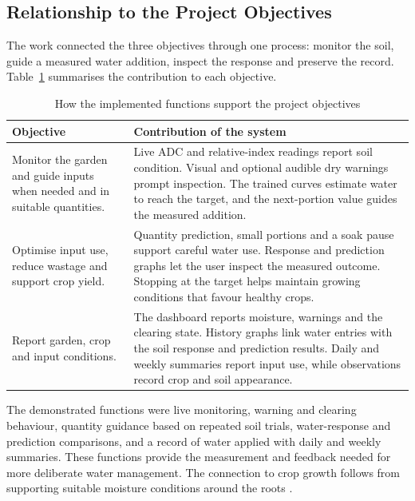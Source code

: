 \documentclass[11pt,a4paper]{article}
\begin{document}
\subsection{Relationship to the Project Objectives}

The work connected the three objectives through one process: monitor the soil, guide a measured water addition, inspect the response and preserve the record. Table~\ref{tab:objectives} summarises the contribution to each objective.

\begin{table}[htbp]
\centering
\caption{How the implemented functions support the project objectives}
\label{tab:objectives}
\begin{tabular}{|>{\raggedright\arraybackslash}p{4.4cm}|>{\raggedright\arraybackslash}p{10.3cm}|}
\hline
\textbf{Objective} & \textbf{Contribution of the system} \\ \hline
Monitor the garden and guide inputs when needed and in suitable quantities. & Live ADC and relative-index readings report soil condition. Visual and optional audible dry warnings prompt inspection. The trained curves estimate water to reach the target, and the next-portion value guides the measured addition. \\ \hline
Optimise input use, reduce wastage and support crop yield. & Quantity prediction, small portions and a soak pause support careful water use. Response and prediction graphs let the user inspect the measured outcome. Stopping at the target helps maintain growing conditions that favour healthy crops. \\ \hline
Report garden, crop and input conditions. & The dashboard reports moisture, warnings and the clearing state. History graphs link water entries with the soil response and prediction results. Daily and weekly summaries report input use, while observations record crop and soil appearance. \\ \hline
\end{tabular}
\end{table}

The demonstrated functions were live monitoring, warning and clearing behaviour, quantity guidance based on repeated soil trials, water-response and prediction comparisons, and a record of water applied with daily and weekly summaries. These functions provide the measurement and feedback needed for more deliberate water management. The connection to crop growth follows from supporting suitable moisture conditions around the roots \cite{ref14}.
\end{document}
